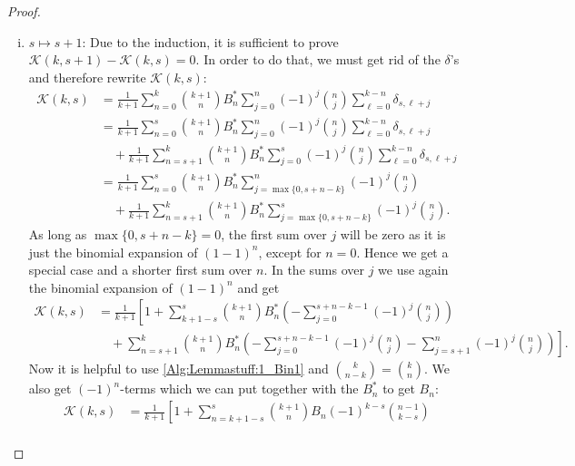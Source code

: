 \begin{proof}
\begin{subproof}
\begin{enumerate}[(i)]
		  \item $s \mapsto s+1$:
			Due to the induction, it is sufficient to prove 
			$\mathcal{K}(k,s+1) - \mathcal{K}(k,s) = 0$.
			In order to do that, we must get rid of the $\delta$'s and 
			therefore rewrite $\mathcal{K}(k,s)$:
			\begin{align*}
				\mathcal{K}(k,s)
				& = 
				\frac{1}{k + 1}	\sum\limits_{n=0}^k
				\binom{k+1}{n} B_n^* \sum\limits_{j=0}^n
				(-1)^j \binom{n}{j} \sum\limits_{\ell=0}^{k-n}
				\delta_{s, \ell+j}\\
				& = 
				\frac{1}{k + 1} \sum\limits_{n=0}^s
				\binom{k+1}{n} B_n^* \sum\limits_{j=0}^n
				(-1)^j \binom{n}{j} \sum\limits_{\ell=0}^{k-n}
				\delta_{s, \ell+j} \\
				& \quad + \frac{1}{k + 1} \sum\limits_{n=s+1}^k
				\binom{k+1}{n} B_n^* \sum\limits_{j=0}^s
				(-1)^j \binom{n}{j} \sum\limits_{\ell=0}^{k-n}
				\delta_{s, \ell+j} \\
				& = \frac{1}{k + 1} \sum\limits_{n=0}^s
				\binom{k+1}{n} B_n^* 
				\sum\limits_{j=\max\{0, s+n-k\}}^n
				(-1)^j \binom{n}{j} \\
				& \quad + \frac{1}{k + 1}
				\sum\limits_{n=s+1}^k
				\binom{k+1}{n} B_n^*
				\sum\limits_{j=\max\{0, s+n-k\}}^s
				(-1)^j \binom{n}{j}.
			\end{align*}
			As long as $\max\{0, s+n-k\} = 0$, the first sum over $j$ will be 
			zero as it is just the binomial expansion of $(1-1)^n$, except for 
			$n = 0$. Hence we get a special case and a shorter first sum over 
			$n$. In the sums over $j$ we use again the binomial expansion of 
			$(1-1)^n$ and get 
			\begin{align*}
				\mathcal{K}(k,s)
				& = 
				\frac{1}{k+1} \left[ 
				1 + \sum\limits_{k+1-s}^s 
				\binom{k+1}{n} B_n^* \left(
				- \sum\limits_{j=0}^{s+n-k-1} 
				(-1)^j \binom{n}{j}\right) \right. \\
				& \quad + \left. 
				\sum\limits_{n=s+1}^k 
				\binom{k+1}{n} B_n^* \left( 
				- \sum\limits_{j=0}^{s+n-k-1} 
				(-1)^j\binom{n}{j} - 
				\sum\limits_{j=s+1}^n 
				(-1)^j \binom{n}{j} \right) \right].
			\end{align*}
			Now it is helpful to use \eqref{Alg:Lemmastuff:1_Bin1} and 
			$\binom{k}{n-k} = \binom{k}{n}$. We also get $(-1)^n$-terms which 
			we can put together with the $B_n^*$ to get $B_n$:
			\begin{align*}
				\mathcal{K}(k,s)
				& = 
				\frac{1}{k+1} \left[
				1+ \sum\limits_{n=k+1-s}^s
				\binom{k+1}{n} B_n (-1)^{k-s}
				\binom{n-1}{k-s} \right. \\

\end{align*}
\end{enumerate}
\end{subproof}
\end{proof}
